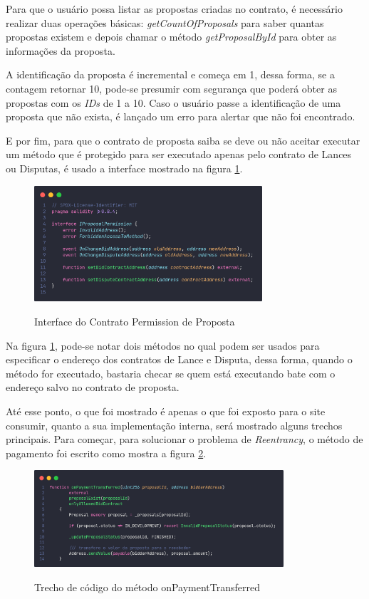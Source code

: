 Para que o usuário possa listar as propostas criadas no contrato, é necessário realizar duas operações básicas: \textit{getCountOfProposals} para saber quantas propostas existem e depois chamar o método \textit{getProposalById} para obter as informações da proposta. 

A identificação da proposta é incremental e começa em 1, dessa forma, se a contagem retornar 10, pode-se presumir com segurança que poderá obter as propostas com os \textit{IDs} de 1 a 10. Caso o usuário passe a identificação de uma proposta que não exista, é lançado um erro para alertar que não foi encontrado.

E por fim, para que o contrato de proposta saiba se deve ou não aceitar executar um método que é protegido para ser executado apenas pelo contrato de Lances ou Disputas, é usado a interface mostrado na figura \ref{fig:proposal_permission_contract_fig}.

\begin{figure}[!h]
  \centering
  \caption{Interface do Contrato Permission de Proposta}
  \includegraphics[width=320px]{src/images/contracts/proposal_permission_contract.png}
  \label{fig:proposal_permission_contract_fig}
\end{figure}

Na figura \ref{fig:proposal_permission_contract_fig}, pode-se notar dois métodos no qual podem ser usados para especificar o endereço dos contratos de Lance e Disputa, dessa forma, quando o método for executado, bastaria checar se quem está executando bate com o endereço salvo no contrato de proposta.

Até esse ponto, o que foi mostrado é apenas o que foi exposto para o site consumir, quanto a sua implementação interna, será mostrado alguns trechos principais. Para começar, para solucionar o problema de \textit{Reentrancy}, o método de pagamento foi escrito como mostra a figura \ref{fig:proposal_core_on_payment_transferred_fig}.

\begin{figure}[!h]
  \centering
  \caption{Trecho de código do método onPaymentTransferred}
  \includegraphics[width=350px]{src/images/contracts/proposal_core_on_payment_transferred.png}
  \label{fig:proposal_core_on_payment_transferred_fig}
\end{figure}

